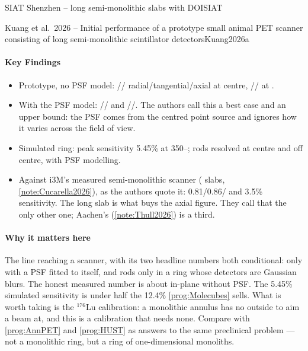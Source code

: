 \begin{programnote}{SIAT Shenzhen -- long semi-monolithic slabs with DOI}{SIAT}
\begin{papernote}{Kuang et al.\ 2026 -- Initial performance of a prototype small animal PET scanner consisting of long semi-monolithic scintillator detectors}{Kuang2026a}
\paragraph{Key Findings}
\begin{itemize}
	\item Prototype, no PSF model: //
		radial/tangential/axial at centre, // at
		.
	\item With the PSF model: // and
		//. The authors call this a best case and an
		upper bound: the PSF comes from the centred point source
		and ignores how it varies across the field of view.
	\item Simulated ring: peak sensitivity 5.45\% at 350--; 
		rods resolved at centre and  off centre, with PSF modelling.
	\item Against i3M's measured semi-monolithic scanner ( slabs,
		\ref{note:Cucarella2026}), as the authors quote it: 0.81/0.86/
		and 3.5\% sensitivity. The long slab is what buys the axial figure.
		They call that the only other one; Aachen's (\ref{note:Thull2026}) is a
		third.
\end{itemize}

\paragraph{Why it matters here}
The line reaching a scanner, with its two headline numbers both conditional:
 only with a PSF fitted to itself, and  rods only in a ring
whose detectors are Gaussian blurs. The honest measured number is about
 in-plane without PSF. The 5.45\% simulated sensitivity is under half
the 12.4\% \ref{prog:Molecubes} sells. What is worth taking is the $^{176}$Lu
calibration: a monolithic annulus has no outside to aim a beam at, and this
is a calibration that needs none. Compare with \ref{prog:AnnPET} and
\ref{prog:HUST} as answers to the same preclinical problem --- not a monolithic
ring, but a ring of one-dimensional monoliths.

\end{papernote}

\end{programnote}


